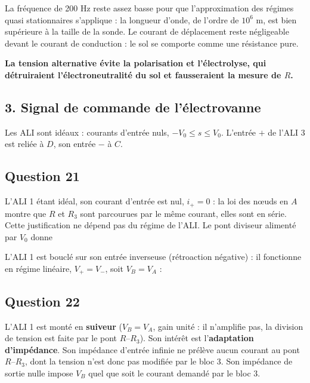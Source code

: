 \documentclass[11pt,a4paper]{article}
\newcommand{\equationajustee}[1]{%
  \sbox{\boiteequation}{$\displaystyle #1$}%
  \ifdim\wd\boiteequation>\linewidth
    \[\resizebox{\linewidth}{!}{\usebox{\boiteequation}}\]%
  \else
    \[#1\]%
  \fi}
\begin{document}
La fréquence de 200 Hz reste assez basse pour que l'approximation des régimes quasi stationnaires s'applique : la longueur d'onde, de l'ordre de \(10^6\) m, est bien supérieure à la taille de la sonde. Le courant de déplacement reste négligeable devant le courant de conduction : le sol se comporte comme une résistance pure.

\textbf{La tension alternative évite la polarisation et l'électrolyse, qui détruiraient l'électroneutralité du sol et fausseraient la mesure de \(R\).}

\hypertarget{signal-de-commande-de-luxe9lectrovanne}{%
\subsection{3. Signal de commande de l'électrovanne}\label{signal-de-commande-de-luxe9lectrovanne}}

Les ALI sont idéaux : courants d'entrée nuls, \(-V_0\le s\le V_0\). L'entrée \(+\) de l'ALI 3 est reliée à \(D\), son entrée \(-\) à \(C\).

\hypertarget{question-21}{%
\subsection{Question 21}\label{question-21}}

L'ALI 1 étant idéal, son courant d'entrée est nul, \(i_+=0\) : la loi des nœuds en \(A\) montre que \(R\) et \(R_3\) sont parcourues par le même courant, elles sont en série. Cette justification ne dépend pas du régime de l'ALI. Le pont diviseur alimenté par \(V_0\) donne

\equationajustee{\boxed{V_A=\frac{R_3}{R+R_3}\,V_0}}

L'ALI 1 est bouclé sur son entrée inverseuse (rétroaction négative) : il fonctionne en régime linéaire, \(V_+=V_-\), soit \(V_B=V_A\) :

\equationajustee{\boxed{V_B=\frac{R_3}{R+R_3}\,V_0}}

\hypertarget{question-22}{%
\subsection{Question 22}\label{question-22}}

L'ALI 1 est monté en \textbf{suiveur} (\(V_B=V_A\), gain unité : il n'amplifie pas, la division de tension est faite par le pont \(R\)--\(R_3\)). Son intérêt est l'\textbf{adaptation d'impédance}. Son impédance d'entrée infinie ne prélève aucun courant au pont \(R\)--\(R_3\), dont la tension n'est donc pas modifiée par le bloc 3. Son impédance de sortie nulle impose \(V_B\) quel que soit le courant demandé par le bloc 3.
\end{document}
